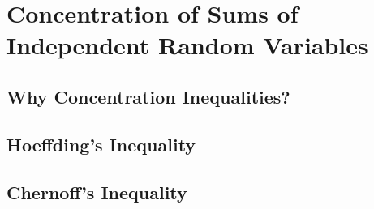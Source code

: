 \documentclass{report}
\theoremstyle{definition}
\newenvironment{exercise}[1]{
  \renewcommand\theexerciseimpl{#1}
  \exerciseimpl
}{\endexerciseimpl}
\begin{document}
\chapter{Concentration of Sums of Independent Random Variables}

\section{Why Concentration Inequalities?}

\begin{exercise}{2.1.4}
\end{exercise}

\section{Hoeffding's Inequality}

\begin{exercise}{2.2.3}
\end{exercise}

\begin{exercise}{2.2.7}
\end{exercise}

\begin{exercise}{2.2.8}
\end{exercise}

\begin{exercise}{2.2.9}
\end{exercise}

\begin{exercise}{2.2.10}
\end{exercise}

\section{Chernoff's Inequality}

\begin{exercise}{2.3.2}
\end{exercise}

\begin{exercise}{2.3.3}
\end{exercise}

\begin{exercise}{2.3.5}
\end{exercise}

\begin{exercise}{2.3.6}
\end{exercise}

\begin{exercise}{2.3.8}
\end{exercise}
\end{document}
